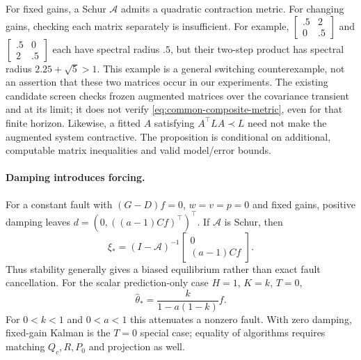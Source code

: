 For fixed gains, a Schur $\mathcal A$ admits a quadratic contraction metric.
For changing gains, checking each matrix separately is insufficient. For example,
$\left[\begin{smallmatrix}.5&2\\0&.5\end{smallmatrix}\right]$ and
$\left[\begin{smallmatrix}.5&0\\2&.5\end{smallmatrix}\right]$ each have spectral
radius $.5$, but their two-step product has spectral radius $2.25+\sqrt5>1$.
This example is a general switching counterexample, not an assertion that these
two matrices occur in our experiments. The existing candidate screen checks
frozen augmented matrices over the covariance transient and at its limit; it
does not verify \eqref{eq:common-composite-metric}, even for that finite horizon.
Likewise, a fitted $A$ satisfying $A^\top LA\prec L$ need not make the augmented
system contractive. The proposition is conditional on additional, computable
matrix inequalities and valid model/error bounds.

\paragraph{Damping introduces forcing.}
For a constant fault with $(G-D)f=0$, $w=v=p=0$ and fixed gains, positive damping
leaves $d=(0,((a-1)Cf)^\top)^\top$. If $\mathcal A$ is Schur, then
\begin{equation}\label{eq:damped-equilibrium}
\xi_*=(I-\mathcal A)^{-1}
\begin{bmatrix}0\\(a-1)Cf\end{bmatrix}.
\end{equation}
Thus stability generally gives a biased equilibrium rather than exact fault
cancellation. For the scalar prediction-only case $H=1$, $K=k$, $T=0$,
\begin{equation}
\hat\theta_* = \frac{k}{1-a(1-k)}f.
\end{equation}
For $0<k<1$ and $0<a<1$ this attenuates a nonzero fault. With zero damping,
fixed-gain Kalman is the $T=0$ special case; equality of algorithms requires
matching $Q_c,R,P_0$ and projection as well.

